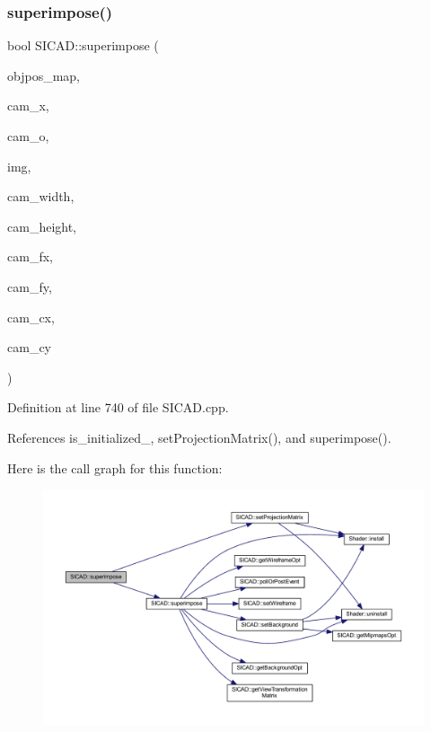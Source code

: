 \subsubsection{\texorpdfstring{superimpose()}{superimpose()}\hspace{0.1cm}{\footnotesize\ttfamily [3/4]}}
{\footnotesize\ttfamily bool S\+I\+C\+A\+D\+::superimpose (\begin{DoxyParamCaption}\item[{const \mbox{\hyperlink{classSuperimpose_a178e3d4e2def6635bfcf9454dd4b5d22}{Model\+Pose\+Container}} \&}]{objpos\+\_\+map,  }\item[{const double $\ast$}]{cam\+\_\+x,  }\item[{const double $\ast$}]{cam\+\_\+o,  }\item[{cv\+::\+Mat \&}]{img,  }\item[{const G\+Lsizei}]{cam\+\_\+width,  }\item[{const G\+Lsizei}]{cam\+\_\+height,  }\item[{const G\+Lfloat}]{cam\+\_\+fx,  }\item[{const G\+Lfloat}]{cam\+\_\+fy,  }\item[{const G\+Lfloat}]{cam\+\_\+cx,  }\item[{const G\+Lfloat}]{cam\+\_\+cy }\end{DoxyParamCaption})\hspace{0.3cm}{\ttfamily [virtual]}}



Definition at line 740 of file S\+I\+C\+A\+D.\+cpp.



References is\+\_\+initialized\+\_\+, set\+Projection\+Matrix(), and superimpose().

Here is the call graph for this function\+:
\nopagebreak
\begin{figure}[H]
\begin{center}
\leavevmode
\includegraphics[width=350pt]{classSICAD_af6c19a679de29992c5f9609f4424add0_cgraph}
\end{center}
\end{figure}
\mbox{\label{classSICAD_a269e238387393b44177daa4eae88fedd}} 
